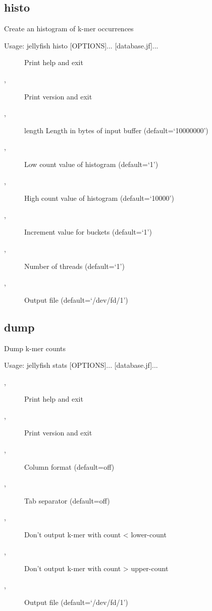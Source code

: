 \subsection{histo}

Create an histogram of k-mer occurrences

Usage: jellyfish histo [OPTIONS]... [database.jf]...

\begin{description}
\item[] Print help and exit
\item[,] Print version and exit
\item[,] length
Length in bytes of input buffer  
(default=`10000000')
\item[,] Low count value of histogram  (default=`1')
\item[,] High count value of histogram  
(default=`10000')
\item[,] Increment value for buckets  (default=`1')
\item[,] Number of threads  (default=`1')
\item[,] Output file  (default=`/dev/fd/1')
\end{description}
\subsection{dump}

Dump k-mer counts

Usage: jellyfish stats [OPTIONS]... [database.jf]...

\begin{description}
\item[,] Print help and exit
\item[,] Print version and exit
\item[,] Column format  (default=off)
\item[,] Tab separator  (default=off)
\item[,] Don't output k-mer with count < lower-count
\item[,] Don't output k-mer with count > upper-count
\item[,] Output file  (default=`/dev/fd/1')
\end{description}
